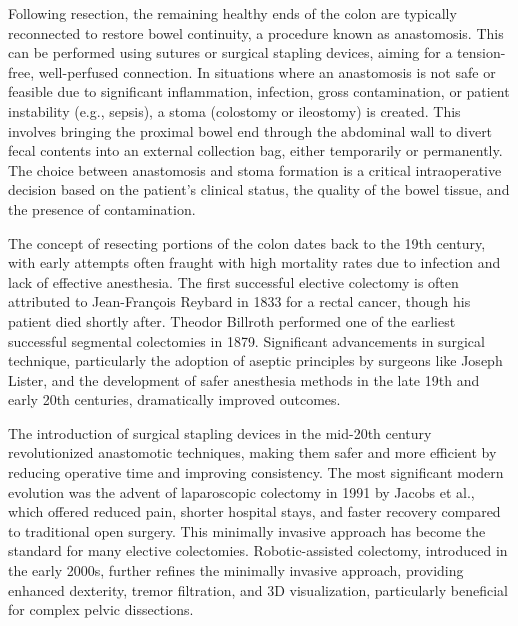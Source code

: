 Following resection, the remaining healthy ends of the colon are typically reconnected to restore bowel continuity, a procedure known as anastomosis. This can be performed using sutures or surgical stapling devices, aiming for a tension-free, well-perfused connection. In situations where an anastomosis is not safe or feasible due to significant inflammation, infection, gross contamination, or patient instability (e.g., sepsis), a stoma (colostomy or ileostomy) is created. This involves bringing the proximal bowel end through the abdominal wall to divert fecal contents into an external collection bag, either temporarily or permanently. The choice between anastomosis and stoma formation is a critical intraoperative decision based on the patient's clinical status, the quality of the bowel tissue, and the presence of contamination.

The concept of resecting portions of the colon dates back to the 19th century, with early attempts often fraught with high mortality rates due to infection and lack of effective anesthesia. The first successful elective colectomy is often attributed to Jean-François Reybard in 1833 for a rectal cancer, though his patient died shortly after. Theodor Billroth performed one of the earliest successful segmental colectomies in 1879. Significant advancements in surgical technique, particularly the adoption of aseptic principles by surgeons like Joseph Lister, and the development of safer anesthesia methods in the late 19th and early 20th centuries, dramatically improved outcomes.

The introduction of surgical stapling devices in the mid-20th century revolutionized anastomotic techniques, making them safer and more efficient by reducing operative time and improving consistency. The most significant modern evolution was the advent of laparoscopic colectomy in 1991 by Jacobs et al., which offered reduced pain, shorter hospital stays, and faster recovery compared to traditional open surgery. This minimally invasive approach has become the standard for many elective colectomies. Robotic-assisted colectomy, introduced in the early 2000s, further refines the minimally invasive approach, providing enhanced dexterity, tremor filtration, and 3D visualization, particularly beneficial for complex pelvic dissections.


